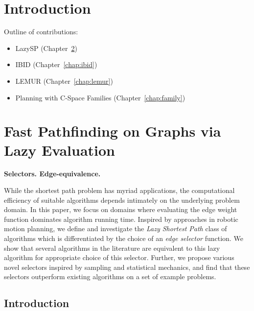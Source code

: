 \documentclass[nobib]{tufte-book}
\begin{document}

\tableofcontents

\chapter{Introduction}

Outline of contributions:
\begin{itemize}
\item LazySP (Chapter~\ref{chap:lazysp})
\item IBID (Chapter~\ref{chap:ibid})
\item LEMUR (Chapter~\ref{chap:lemur})
\item Planning with C-Space Families (Chapter~\ref{chap:family})
\end{itemize}

\chapter{Fast Pathfinding on Graphs via Lazy Evaluation}
\label{chap:lazysp}

{\bf Selectors.
Edge-equivalence.}

While the shortest path problem has myriad applications,
the computational efficiency of suitable algorithms
depends intimately on the underlying problem domain.
In this paper,
we focus on domains where evaluating the edge weight function
dominates algorithm running time.
Inspired by approaches in robotic motion planning,
we define and investigate the \emph{Lazy Shortest Path} class of
algorithms which is differentiated by the choice of
an \emph{edge selector} function.
We show that several algorithms in the literature are equivalent to
this lazy algorithm for appropriate choice of this selector.
Further, we propose various novel selectors inspired by
sampling and statistical mechanics,
and find that these selectors outperform
existing algorithms on a set of example problems.

\section{Introduction}
\end{document}
